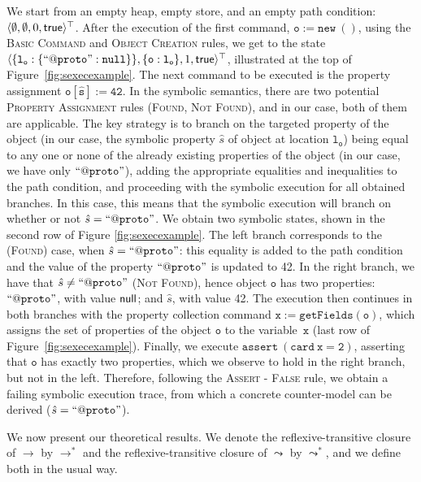 We start from an empty heap, empty store, and an empty path condition: $\langle \emptyset, \emptyset, 0, {\sf true} \rangle^\top$. After the execution of the first command, $\mathtt{o := new\ ()}$, using the \textsc{Basic Command} and \textsc{Object Creation} rules, we get to the state {\small $\langle \{ \mathtt{l_o : \{ ``@proto" : null} \} \}, \{ \mathtt{o : l_o} \} , 1, {\sf true} \rangle^\top$}, illustrated at the top of Figure~\ref{fig:sexecexample}.
The next command to be executed is the property assignment $\mathtt{o[\hat{s}] := 42}$. In the symbolic semantics, there are two potential \textsc{Property Assignment} rules (\textsc{Found}, \textsc{Not Found}), and in our case, both of them are applicable. The key strategy is to branch on the targeted property of the object (in our case, the symbolic property $\hat{s}$ of object at location $\mathtt{l_o}$) being equal to any one or none of the already existing properties of the object (in our case, we have only $\mathtt{``@proto"}$), adding the appropriate equalities and inequalities to the path condition, and proceeding with the symbolic execution for all obtained branches. In this case, this means that the symbolic execution will branch on whether or not $\hat{s} = \mathtt{``@proto"}$. We obtain two symbolic states, shown in the second row of Figure \ref{fig:sexecexample}. The left branch corresponds to the (\textsc{Found}) case, when $\hat{s} = \mathtt{``@proto"}$: this equality is added to the path condition and the value of the property $\mathtt{``@proto"}$ is updated to 42. In the right branch, we have that $\hat{s} \neq \mathtt{``@proto"}$ (\textsc{Not Found}), hence object $\mathtt{o}$ has two properties: $ \mathtt{``@proto"}$, with value ${\sf null}$; and $\hat{s}$, with value 42.
The execution then continues in both branches with the property collection command $\mathtt{x := getFields(o)}$, which assigns the set of properties of the object $\mathtt{o}$ to the variable~$\mathtt{x}$ (last row of Figure~\ref{fig:sexecexample}). Finally, we execute $\mathtt{assert\ (card \ x = 2)}$, asserting that $\mathtt{o}$ has exactly two properties, which we observe to hold in the right branch, but not in the left.
Therefore, following the \textsc{Assert - False} rule, we obtain a failing symbolic execution trace, from which a concrete counter-model can be derived ($\hat{s} = \mathtt{``@proto"}$).

We now present our theoretical results. We denote the reflexive-transitive closure of $\rightarrow$ by $\rightarrow^*$ and the reflexive-transitive closure of $\leadsto$ by $\leadsto^*$, and we define both in the usual way.

